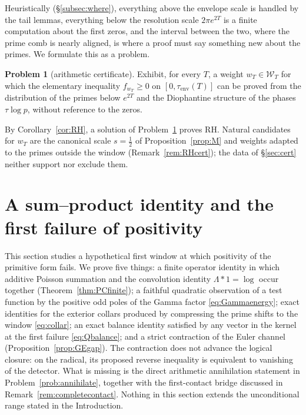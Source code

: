 \documentclass[11pt]{amsart}
\theoremstyle{definition}
\newtheorem{problem}[theorem]{Problem}
\theoremstyle{remark}
\newcommand{\Wcl}{\mathcal W_T}
\begin{document}
Heuristically (\S\ref{subsec:where}), everything above the envelope scale is handled by the tail lemmas,
everything below the resolution scale $2\pi e^{2T}$ is a finite computation about the first zeros, and the
interval between the two, where the prime comb is nearly aligned, is where a proof must say something
new about the primes. We formulate this as a problem.

\begin{problem}[arithmetic certificate]\label{prob:B}
Exhibit, for every $T$, a weight $w_T\in\Wcl$ for which the elementary inequality
$f_{w_T}\ge0$ on $[0,\tau_{\mathrm{env}}(T)]$ can be proved from the distribution of the primes
below $e^{2T}$ and the Diophantine structure of the phases $\tau\log p$, without reference to
the zeros.
\end{problem}
By Corollary~\ref{cor:RH}, a solution of Problem~\ref{prob:B} proves RH. Natural candidates for $w_T$ are the
canonical scale $s=\frac12$ of Proposition~\ref{prop:M} and weights adapted to the primes outside the
window (Remark~\ref{rem:RHcert}); the data of \S\ref{sec:cert} neither support nor exclude them.


\section{A sum--product identity and the first failure of positivity}\label{sec:firstcontact}

This section studies a hypothetical first window at which positivity of the primitive form fails.
We prove five things: a finite operator identity in which additive Poisson summation and the
convolution identity $\Lambda*1=\log$ occur together (Theorem~\ref{thm:PCfinite}); a faithful
quadratic observation of a test function by the positive odd poles of the Gamma factor
\eqref{eq:Gammaenergy}; exact identities for the exterior collars produced by compressing the
prime shifts to the window \eqref{eq:collar}; an exact balance identity satisfied by any vector in
the kernel at the first failure \eqref{eq:Qbalance}; and a strict contraction of the Euler channel
(Proposition~\ref{prop:GEgap}).  The contraction does not advance the logical closure: on the
radical, its proposed reverse inequality is equivalent to vanishing of the detector.  What is
missing is the direct arithmetic annihilation statement in Problem~\ref{prob:annihilate}, together
with the first-contact bridge discussed in Remark~\ref{rem:completecontact}.  Nothing in this
section extends the unconditional range stated in the Introduction.
\end{document}
